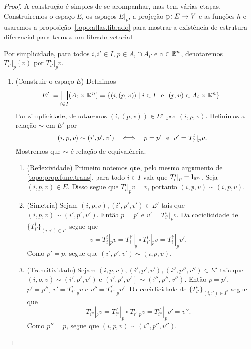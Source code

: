 \begin{proof}
A construção é simples de se acompanhar, mas tem várias etapas. Construiremos o espaço $E$, os espaços $E|_p$, a projeção $\mathrm{p}\colon E \to V$ e as funções $h$ e usaremos a proposição~\ref{topo:atlas.fibrado} para mostrar a existência de estrutura diferencial para termos um fibrado vetorial.

Por simplicidade, para todos $i,i' \in I$, $p \in A_i \cap A_{i'}$ e $v \in \mathbb{R}^n$, denotaremos $T^i_{i'}|_p (v)$ por $T^i_{i'}|_p v$.
\begin{enumerate}
\item (Construir o espaço $E$) Definimos
	\begin{equation*}
	E' := \bigsqcup_{i \in I} (A_i \times \mathbb{R}^n) = \left\{{(i,(p,v))}\;\middle\vert\;{i \in I \text{\ \ e\ \ } (p,v) \in A_i \times \mathbb{R}^n}\right\}.
	\end{equation*}
Por simplicidade, denotaremos $(i,(p,v)) \in E'$ por $(i,p,v)$. Definimos a relação $\sim$ em $E'$ por
	\begin{equation*}
	(i,p,v) \sim (i',p',v') \quad \Longleftrightarrow \quad p=p' \text{\ \ e\ \ } v'=T^i_{i'}|_p v.
	\end{equation*}
Mostremos que $\sim$ é relação de equivalência.

	\begin{enumerate}
	\item (Reflexividade) Primeiro notemos que, pelo mesmo argumento de \ref{topo:prop.func.trans}, para todo $i \in I$ vale que $T^i_i|_p = \mathrm{I}_{\mathbb{R}^n}$. Seja $(i,p,v) \in E$. %
Disso segue que $T^i_i|_p v = v$, portanto $(i,p,v) \sim (i,p,v)$.

	\item (Simetria) Sejam $(i,p,v), (i',p',v') \in E'$ tais que $(i,p,v) \sim (i',p',v')$. Então $p=p'$ e $v'=T^i_{i'}|_p v$. Da %
cociclicidade de $\{T^i_{i'}\}_{(i,i') \in I^2}$ segue que
	\begin{equation*}
	v = T^i_i|_p v = T^{i'}_i|_p \circ T^i_{i'}|_p v = T^{i'}_i|_p v'.
	\end{equation*}
Como $p'=p$, segue que $(i',p',v') \sim (i,p,v)$.

	\item (Transitividade) Sejam $(i,p,v), (i',p',v'), (i'',p'',v'') \in E'$ tais que $(i,p,v) \sim (i',p',v')$ e $(i',p',v') \sim (i'',p'',v'')$. Então $p=p'$, $p'=p''$, $v'=T^i_{i'}|_p v$ e $v''=T^{i'}_{i''}|_p v'$. Da cociclicidade de $\{T^i_{i'}\}_{(i,i') \in I^2}$ segue que
	\begin{equation*}
	T^i_{i''}|_p v = T^{i'}_{i''}|_p \circ T^i_{i'}|_p v = T^{i'}_{i''}|_p v' = v''.
	\end{equation*}
Como $p''=p$, segue que $(i,p,v) \sim (i'',p'',v'')$.
	\end{enumerate}


\end{enumerate}
\end{proof}
